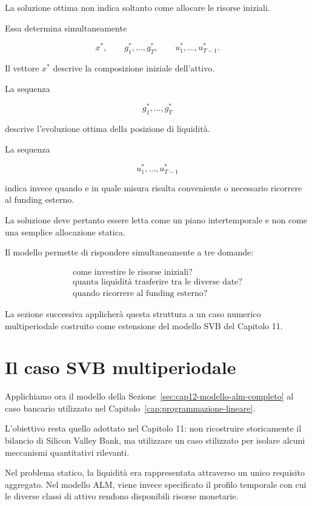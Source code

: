 La soluzione ottima non indica soltanto come allocare le risorse iniziali.

Essa determina simultaneamente

\[
x^*,
\qquad
g_1^*,\ldots,g_T^*,
\qquad
u_1^*,\ldots,u_{T-1}^*.
\]

Il vettore $x^*$ descrive la composizione iniziale dell'attivo.

La sequenza

\[
g_1^*,\ldots,g_T^*
\]

\noindent descrive l'evoluzione ottima della posizione di liquidit\`a.

La sequenza

\[
u_1^*,\ldots,u_{T-1}^*
\]

\noindent indica invece quando e in quale misura risulta conveniente o necessario
ricorrere al funding esterno.

La soluzione deve pertanto essere letta come un piano intertemporale e non
come una semplice allocazione statica.

Il modello permette di rispondere simultaneamente a tre domande:

\[
\boxed{
\begin{array}{c}
\text{come investire le risorse iniziali?}\\[3pt]
\text{quanta liquidit\`a trasferire tra le diverse date?}\\[3pt]
\text{quando ricorrere al funding esterno?}
\end{array}
}
\]

La sezione successiva applicher\`a questa struttura a un caso numerico
multiperiodale costruito come estensione del modello SVB del Capitolo 11.

\section{Il caso SVB multiperiodale}

\label{sec:cap12-caso-svb-multiperiodale}

Applichiamo ora il modello della
Sezione~\ref{sec:cap12-modello-alm-completo} al caso bancario utilizzato nel
Capitolo~\ref{cap:programmazione-lineare}.

L'obiettivo resta quello adottato nel Capitolo 11: non ricostruire
storicamente il bilancio di Silicon Valley Bank, ma utilizzare un caso
stilizzato per isolare alcuni meccanismi quantitativi rilevanti.

Nel problema statico, la liquidit\`a era rappresentata attraverso un unico
requisito aggregato. Nel modello ALM, viene invece specificato il profilo
temporale con cui le diverse classi di attivo rendono disponibili risorse
monetarie.

